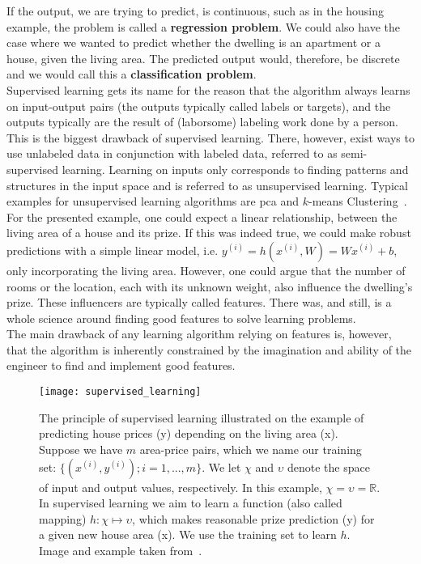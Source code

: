 If the output, we are trying to predict, is continuous, such as in the housing example, the problem is called a \textbf{regression problem}. We could also have the case where we wanted to predict whether the dwelling is an apartment or a house, given the living area. The predicted output would, therefore, be discrete and we would call this a \textbf{classification problem}.\\
Supervised learning gets its name for the reason that the algorithm always learns on input-output pairs (the outputs typically called labels or targets), and the outputs typically are the result of (laborsome) labeling work done by a person. This is the biggest drawback of supervised learning. There, however, exist ways to use unlabeled data in conjunction with labeled data, referred to as semi-supervised learning. Learning on inputs only corresponds to finding patterns and structures in the input space and is referred to as unsupervised learning. Typical examples for unsupervised learning algorithms are \gls{pca} and $k$-means Clustering~\cite{Goodfellow2016DeepLearning}.\\
For the presented example, one could expect a linear relationship, between the living area of a house and its prize. If this was indeed true, we could make robust predictions with a simple linear model, i.e. $y^{(i)} = h(x^{(i)}, W) = Wx^{(i)} + b$, only incorporating the living area. However, one could argue that the number of rooms or the location, each with its unknown weight, also influence the dwelling's prize. These influencers are typically called features. There was, and still, is a whole science around finding good features to solve learning problems.\\
The main drawback of any learning algorithm relying on features is, however, that the algorithm is inherently constrained by the imagination and ability of the engineer to find and implement good features.

\begin{figure}[htbp]
    \centering
	\texttt{[image: supervised\_learning]}
    \caption[Supervised Learning]{The principle of supervised learning illustrated on the example of predicting house prices (y) depending on the living area (x). Suppose we have $m$ area-price pairs, which we name our training set: $\{(x^{(i)}, y^{(i)}); i = 1,...,m\}$. We let $\chi$ and $\upsilon$ denote the space of input and output values, respectively. In this example, $\chi = \upsilon = \mathbb{R}$. In supervised learning we aim to learn a function (also called mapping) $h : \chi \mapsto \upsilon$, which makes reasonable prize prediction (y) for a given new house area (x). We use the training set to learn $h$. Image and example taken from~\cite{Ng2012StanfordNotes}.}
    \label{fig:dl_supervised}
\end{figure}

